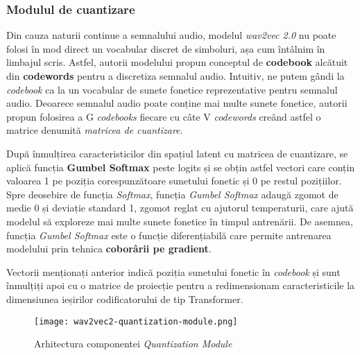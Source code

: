 \subsubsection{Modulul de cuantizare}
\vspace{1em}
Din cauza naturii continue a semnalului audio, modelul \textit{wav2vec 2.0} nu poate folosi în mod direct
un vocabular discret de simboluri, așa cum întâlnim în limbajul scris. Astfel, autorii modelului propun
conceptul de \textbf{codebook} alcătuit din \textbf{codewords} pentru a discretiza semnalul audio. Intuitiv,
ne putem gândi la \textit{codebook} ca la un vocabular de sunete fonetice reprezentative pentru semnalul
audio. Deoarece semnalul audio poate conține mai multe sunete fonetice, autorii propun folosirea
a G \textit{codebooks} fiecare cu câte V \textit{codewords} creând astfel o matrice denumită \textit{matricea
de cuantizare}.
\par
După înmulțirea caracteristicilor din spațiul latent cu matricea de cuantizare, se aplică funcția
\textbf{Gumbel Softmax} peste logits și se obțin astfel vectori care conțin valoarea 1 pe poziția
corespunzătoare sunetului fonetic și 0 pe restul pozițiilor. Spre deosebire de funcția \textit{Softmax},
funcția \textit{Gumbel Softmax} adaugă zgomot de medie 0 și deviație standard 1, zgomot reglat cu 
ajutorul temperaturii, care ajută modelul să exploreze mai multe sunete fonetice în timpul antrenării.
De asemnea, funcția \textit{Gumbel Softmax} este o funcție diferențiabilă care permite antrenarea modelului
prin tehnica \textbf{coborârii pe gradient}.
\par
Vectorii menționați anterior indică poziția sunetului fonetic în \textit{codebook} și sunt înmulțiți
apoi cu o matrice de proiecție pentru a redimensionam caracteristicile la dimensiunea ieșirilor
codificatorului de tip Transformer.

\vspace{1.5em}
\begin{figure}[h]
    \centering
    \texttt{[image: wav2vec2-quantization-module.png]}
    \caption{Arhitectura componentei \textit{Quantization Module} \protect\footnotemark[1]}
    \label{fig:wav2vec2-quantization-module}
\end{figure}
\vspace{1em}

